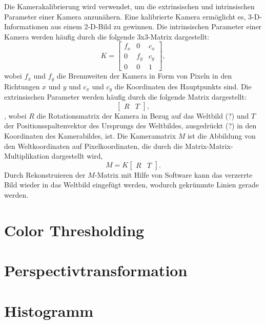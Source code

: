 \documentclass[arbeit=studie,oneside,BCOR=12mm]{ArbeitRST}
\begin{document}
Die Kamerakalibrierung wird verwendet, um die extrinsischen und intrinsischen
Parameter einer Kamera anzunähern. Eine kalibrierte Kamera ermöglicht es,
3-D-Informationen aus einem 2-D-Bild zu gewinnen. Die intrinsischen Parameter
einer Kamera werden häufig durch die folgende 3x3-Matrix dargestellt:
\begin{equation} 
    K = 
    \begin{bmatrix} 
        f_x & 0 & c_x\\ 
        0 & f_y & c_y\\ 
        0 & 0 & 1
    \end{bmatrix}, 
\end{equation} 
wobei $f_x$ und $f_y$ die Brennweiten der Kamera in Form von Pixeln in den
Richtungen $x$ und $y$ und $c_x$ und $c_y$ die Koordinaten des Hauptpunkts
sind. Die extrinsischen Parameter werden häufig durch die folgende Matrix
dargestellt: 
\begin{equation}
    \begin{bmatrix} R & T \end{bmatrix}, 
\end{equation}, 
wobei $R$ die Rotationsmatrix der Kamera in Bezug auf das Weltbild (?) und $T$
der Positionsspaltenvektor des Ursprungs des Weltbildes, ausgedrückt (?) in den
Koordinaten des Kamerabildes, ist. Die Kameramatrix $M$ ist die Abbildung von
den Weltkoordinaten auf Pixelkoordinaten, die durch die
Matrix-Matrix-Multiplikation dargestellt wird, 
\begin{equation} 
    M = K 
    \begin{bmatrix} 
        R & T
    \end{bmatrix}. 
\end{equation} 
Durch Rekonstruieren der $M$-Matrix mit Hilfe von Software kann das verzerrte
Bild wieder in das Weltbild eingefügt werden, wodurch gekrümmte Linien gerade
werden.




\section{Color Thresholding}

\section{Perspectivtransformation}

\section{Histogramm}
\end{document}

